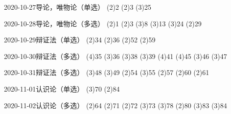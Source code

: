 \documentclass{ctexart}
\begin{document}
\begin{sdpolitics}{2020-10-27}{导论，唯物论（单选）}
  \addto[2020-10-29](2){2}
  \addto[2020-10-31](2){3}
  \addto[2020-10-31](3){25}
\end{sdpolitics}

\begin{sdpolitics}{2020-10-28}{导论，唯物论（多选）}
  \addto[2020-10-30](2){1}
  \addto[2020-10-30](2){3}
  \addto[2020-11-01](3){8}
  \addto[2020-11-01](3){13}
  \addto[2020-11-01](3){24}
  \addto[2020-10-30](2){29}
\end{sdpolitics}

\begin{sdpolitics}{2020-10-29}{辩证法（单选）}
  \addto[2020-10-31](2){34}
  \addto[2020-10-31](2){36}
  \addto[2020-11-02](2){52}
  \addto[2020-10-31](2){59}
\end{sdpolitics}

\begin{sdpolitics}{2020-10-30}{辩证法（多选）}
  \addto[2020-11-06](4){35}
  \addto[2020-11-01](3){36}
  \addto[2020-11-01](3){38}
  \addto[2020-11-01](3){39}
  \addto[2020-11-06](4){41}
  \addto[2020-11-03](4){45}
  \addto[2020-11-01](3){46}
  \addto[2020-11-01](3){47}
\end{sdpolitics}

\begin{sdpolitics}{2020-10-31}{辩证法（多选）}
  \addto[2020-11-04](3){48}
  \addto[2020-11-04](3){49}
  \addto[2020-11-02](2){54}
  \addto[2020-11-04](3){55}
  \addto[2020-11-02](2){57}
  \addto[2020-11-02](2){60}
  \addto[2020-11-02](2){61}
\end{sdpolitics}

\begin{sdpolitics}{2020-11-01}{认识论（单选）}
  \addto[2020-11-06](3){70}
  \addto[2020-11-03](2){84}
\end{sdpolitics}

\begin{sdpolitics}{2020-11-02}{认识论（多选）}
  \addto[2020-11-04](2){64}
  \addto[2020-11-04](2){71}
  \addto[2020-11-04](2){72}
  \addto[2020-11-06](3){73}
  \addto[2020-11-06](3){78}
  \addto[2020-11-04](2){80}
  \addto[2020-11-06](3){83}
  \addto[2020-11-06](3){84}
\end{sdpolitics}
\end{document}
